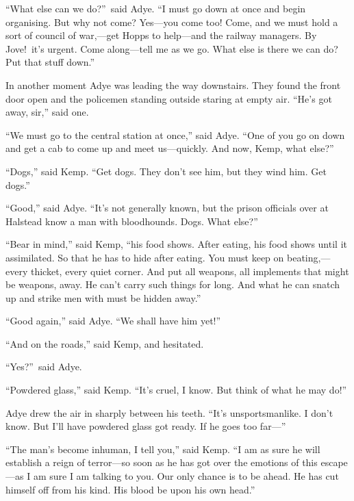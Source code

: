“What else can we do?”\ said Adye. “I must go down at once and begin organising. But why not come? Yes—you come too! Come, and we must hold a sort of council of war,—get Hopps to help—and the railway managers. By Jove!\ it’s urgent. Come along—tell me as we go. What else is there we can do? Put that stuff down.”

In another moment Adye was leading the way downstairs. They found the front door open and the policemen standing outside staring at empty air. “He’s got away, sir,” said one.

“We must go to the central station at once,” said Adye. “One of you go on down and get a cab to come up and meet us—quickly. And now, Kemp, what else?”

“Dogs,” said Kemp. “Get dogs. They don’t see him, but they wind him. Get dogs.”

“Good,” said Adye. “It’s not generally known, but the prison officials over at Halstead know a man with bloodhounds. Dogs. What else?”

“Bear in mind,” said Kemp, “his food shows. After eating, his food shows until it assimilated. So that he has to hide after eating. You must keep on beating,—every thicket, every quiet corner. And put all weapons, all implements that might be weapons, away. He can’t carry such things for long. And what he can snatch up and strike men with must be hidden away.”

“Good again,” said Adye. “We shall have him yet!”

“And on the roads,” said Kemp, and hesitated.

“Yes?”\ said Adye.

“Powdered glass,” said Kemp. “It’s cruel, I know. But think of what he may do!”

Adye drew the air in sharply between his teeth. “It’s unsportsmanlike. I don’t know. But I’ll have powdered glass got ready. If he goes too far—”

“The man’s become inhuman, I tell you,” said Kemp. “I am as sure he will establish a reign of terror—so soon as he has got over the emotions of this escape—as I am sure I am talking to you. Our only chance is to be ahead. He has cut himself off from his kind. His blood be upon his own head.”